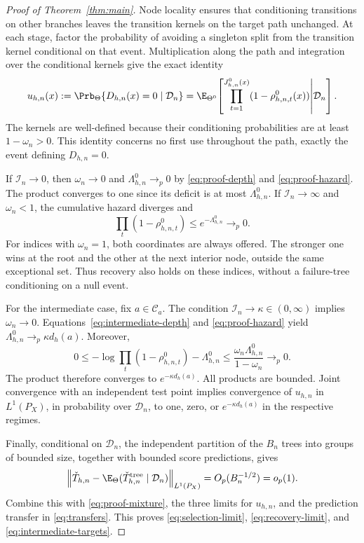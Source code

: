 \begin{appendix}
\begin{proof}[Proof of Theorem~\ref{thm:main}]
Node locality ensures that conditioning transitions on other branches leaves
the transition kernels on the target path unchanged. At each stage, factor
the probability of avoiding a singleton split from
the transition kernel conditional on that event. Multiplication along the
path and integration over the conditional kernels give the exact identity
\begin{equation}\label{eq:proof-survival}
u_{h,n}(x):=\Prb_\Theta\{D_{h,n}(x)=0\mid\mathcal D_n\}
=\E_{\Theta^0}\!\left[
\prod_{t=1}^{J_{h,n}^0(x)}(1-\rho_{h,n,t}^0(x))
\middle|\mathcal D_n\right].
\end{equation}
The kernels are well-defined because their conditioning probabilities are
at least \(1-\omega_n>0\). This identity concerns no first use throughout
the path, exactly the event defining \(D_{h,n}=0\).

If \(\mathcal I_n\to0\), then \(\omega_n\to0\) and
\(\Lambda_{h,n}^0\to_p0\) by \eqref{eq:proof-depth} and
\eqref{eq:proof-hazard}. The product converges to one since its deficit is
at most \(\Lambda_{h,n}^0\). If \(\mathcal I_n\to\infty\) and
\(\omega_n<1\), the cumulative hazard diverges and
\[
\prod_t(1-\rho_{h,n,t}^0)\le e^{-\Lambda_{h,n}^0}\longrightarrow_p0.
\]
For indices with \(\omega_n=1\), both coordinates are always offered.
The stronger one wins at the root and the other at the next interior node,
outside the same exceptional set. Thus recovery also holds on these indices,
without a failure-tree conditioning on a null event.

For the intermediate case, fix \(a\in\mathcal C_a\).
The condition \(\mathcal I_n\to\kappa\in(0,\infty)\) implies
\(\omega_n\to0\). Equations~\eqref{eq:intermediate-depth} and
\eqref{eq:proof-hazard} yield
\(\Lambda_{h,n}^0\to_p\kappa d_h(a)\). Moreover,
\[
0\le-\log\prod_t(1-\rho_{h,n,t}^0)-\Lambda_{h,n}^0
\le\frac{\omega_n\Lambda_{h,n}^0}{1-\omega_n}
\longrightarrow_p0.
\]
The product therefore converges to \(e^{-\kappa d_h(a)}\).
All products are bounded. Joint convergence with an independent test point
implies convergence of \(u_{h,n}\) in \(L^1(P_X)\), in probability over
\(\mathcal D_n\), to one, zero, or \(e^{-\kappa d_h(a)}\) in the respective
regimes.

Finally, conditional on \(\mathcal D_n\), the independent partition of the
\(B_n\) trees into groups of bounded size, together with bounded score
predictions, gives
\[
\left\|\check T_{h,n}-
\E_\Theta(\check T^{\rm tree}_{h,n}\mid\mathcal D_n)\right\|_{L^1(P_X)}
=O_p(B_n^{-1/2})=o_p(1).
\]
Combine this with \eqref{eq:proof-mixture}, the three limits for \(u_{h,n}\),
and the prediction transfer in \eqref{eq:transfers}. This proves
\eqref{eq:selection-limit}, \eqref{eq:recovery-limit}, and
\eqref{eq:intermediate-targets}.


\end{proof}
\end{appendix}
